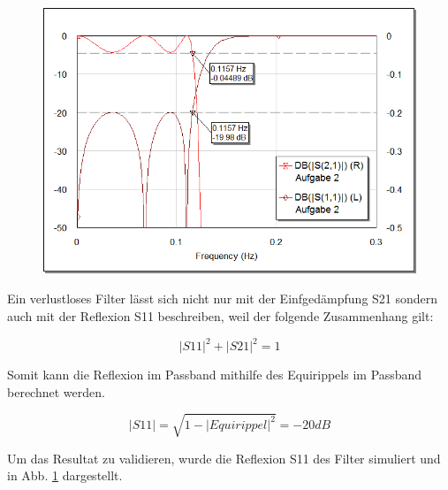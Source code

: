 \begin{figure}[h!]
    \centering
    \includegraphics[width=\imagewidth]{images/graph-LC}
    \caption{}
    \label{fig:graph-LC}
\end{figure}

Ein verlustloses Filter lässt sich nicht nur mit der Einfgedämpfung S21 sondern auch mit der Reflexion S11 beschreiben, weil der folgende Zusammenhang gilt:

\begin{equation}
{|S11|}^2 + {|S21|}^2 = 1
\end{equation}

Somit kann die Reflexion im Passband mithilfe des Equirippels im Passband berechnet werden.

\begin{equation}
|S11| = \sqrt{1-{|Equirippel|}^2} = -20 dB
\end{equation}

Um das Resultat zu validieren, wurde die Reflexion S11 des Filter simuliert und in Abb. \ref{fig:graph-LC} dargestellt.


